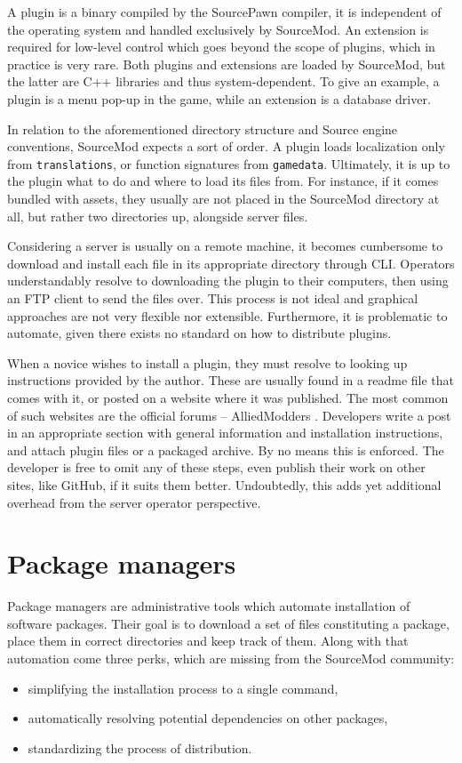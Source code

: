 A plugin is a binary compiled by the SourcePawn compiler, it is independent of the operating system and handled exclusively by SourceMod.
An extension is required for low-level control which goes beyond the scope of plugins, which in practice is very rare.
Both plugins and extensions are loaded by SourceMod, but the latter are C++ libraries and thus system-dependent.
To give an example, a plugin is a menu pop-up in the game, while an extension is a database driver.

In relation to the aforementioned directory structure and Source engine conventions, SourceMod expects a sort of order.
A plugin loads localization only from \verb|translations|, or function signatures from \verb|gamedata|.
Ultimately, it is up to the plugin what to do and where to load its files from.
For instance, if it comes bundled with assets, they usually are not placed in the SourceMod directory at all, but rather two directories up, alongside server files.

Considering a server is usually on a remote machine, it becomes cumbersome to download and install each file in its appropriate directory through CLI\@.
Operators understandably resolve to downloading the plugin to their computers, then using an FTP client to send the files over.
This process is not ideal and graphical approaches are not very flexible nor extensible.
Furthermore, it is problematic to automate, given there exists no standard on how to distribute plugins.

When a novice wishes to install a plugin, they must resolve to looking up instructions provided by the author.
These are usually found in a readme file that comes with it, or posted on a website where it was published.
The most common of such websites are the official forums -- AlliedModders \cite{alliedmodders-plugins}.
Developers write a post in an appropriate section with general information and installation instructions, and attach plugin files or a packaged archive.
By no means this is enforced.
The developer is free to omit any of these steps, even publish their work on other sites, like GitHub, if it suits them better.
Undoubtedly, this adds yet additional overhead from the server operator perspective.

\section{Package managers}

Package managers are administrative tools which automate installation of software packages.
Their goal is to download a set of files constituting a package, place them in correct directories and keep track of them.
Along with that automation come three perks, which are missing from the SourceMod community:
\begin{itemize}
    \item simplifying the installation process to a single command,
    \item automatically resolving potential dependencies on other packages,
    \item standardizing the process of distribution.
\end{itemize}

